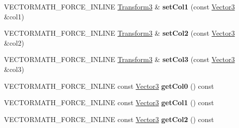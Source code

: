 \begin{DoxyCompactItemize}
\item 
\mbox{\label{classVectormath_1_1Aos_1_1Transform3_af1e0e1cf7c7b3690c0c28a74af6cacce}} 
V\+E\+C\+T\+O\+R\+M\+A\+T\+H\+\_\+\+F\+O\+R\+C\+E\+\_\+\+I\+N\+L\+I\+NE \hyperlink{classVectormath_1_1Aos_1_1Transform3}{Transform3} \& {\bfseries set\+Col1} (const \hyperlink{classVectormath_1_1Aos_1_1Vector3}{Vector3} \&col1)
\item 
\mbox{\label{classVectormath_1_1Aos_1_1Transform3_ac5ab367ea868341ff0a0a0bf09226808}} 
V\+E\+C\+T\+O\+R\+M\+A\+T\+H\+\_\+\+F\+O\+R\+C\+E\+\_\+\+I\+N\+L\+I\+NE \hyperlink{classVectormath_1_1Aos_1_1Transform3}{Transform3} \& {\bfseries set\+Col2} (const \hyperlink{classVectormath_1_1Aos_1_1Vector3}{Vector3} \&col2)
\item 
\mbox{\label{classVectormath_1_1Aos_1_1Transform3_a1c1ed507d5d731a9dd9cb037e0eaf948}} 
V\+E\+C\+T\+O\+R\+M\+A\+T\+H\+\_\+\+F\+O\+R\+C\+E\+\_\+\+I\+N\+L\+I\+NE \hyperlink{classVectormath_1_1Aos_1_1Transform3}{Transform3} \& {\bfseries set\+Col3} (const \hyperlink{classVectormath_1_1Aos_1_1Vector3}{Vector3} \&col3)
\item 
\mbox{\label{classVectormath_1_1Aos_1_1Transform3_af84b057ecd0867928ad968c55d7633a7}} 
V\+E\+C\+T\+O\+R\+M\+A\+T\+H\+\_\+\+F\+O\+R\+C\+E\+\_\+\+I\+N\+L\+I\+NE const \hyperlink{classVectormath_1_1Aos_1_1Vector3}{Vector3} {\bfseries get\+Col0} () const
\item 
\mbox{\label{classVectormath_1_1Aos_1_1Transform3_a60357e4d58920d8e182c59e1361cba28}} 
V\+E\+C\+T\+O\+R\+M\+A\+T\+H\+\_\+\+F\+O\+R\+C\+E\+\_\+\+I\+N\+L\+I\+NE const \hyperlink{classVectormath_1_1Aos_1_1Vector3}{Vector3} {\bfseries get\+Col1} () const
\item 
\mbox{\label{classVectormath_1_1Aos_1_1Transform3_a62876950b2e621a6e5c93f6ac04fb6e4}} 
V\+E\+C\+T\+O\+R\+M\+A\+T\+H\+\_\+\+F\+O\+R\+C\+E\+\_\+\+I\+N\+L\+I\+NE const \hyperlink{classVectormath_1_1Aos_1_1Vector3}{Vector3} {\bfseries get\+Col2} () const
\item 
\mbox{\label{classVectormath_1_1Aos_1_1Transform3_a3d637b0f7e3d0827e3d4b8824ae571bc}} 

\end{DoxyCompactItemize}
